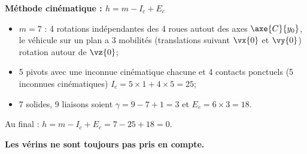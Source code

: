 
\ifprof
\begin{corrige}
\textbf{Méthode cinématique : $h = m - I_c + E_c$}
\begin{itemize}
\item $m=7$ : 4 rotations indépendantes des 4 roues autout des axes $\axe{C}{y_0}$, le véhicule sur un plan a 3 mobilités (translations suivant $\vx{0}$ et $\vy{0}$) rotation autour de $\vz{0}$;
\item 5 pivots avec une inconnue cinématique chacune et 4 contacts ponctuels (5 inconnues cinématiques) $I_c = 5\times 1 + 4\times 5 = 25$;
\item 7 solides, 9 liaisons soient $\gamma = 9-7+1 = 3$ et $E_c = 6\times 3 = 18$.
\end{itemize}
Au final : $h = m - I_c + E_c= 7 - 25 + 18 = 0$.
\end{corrige}
\else\fi

\textbf{Les vérins ne sont toujours pas pris en compte.}

